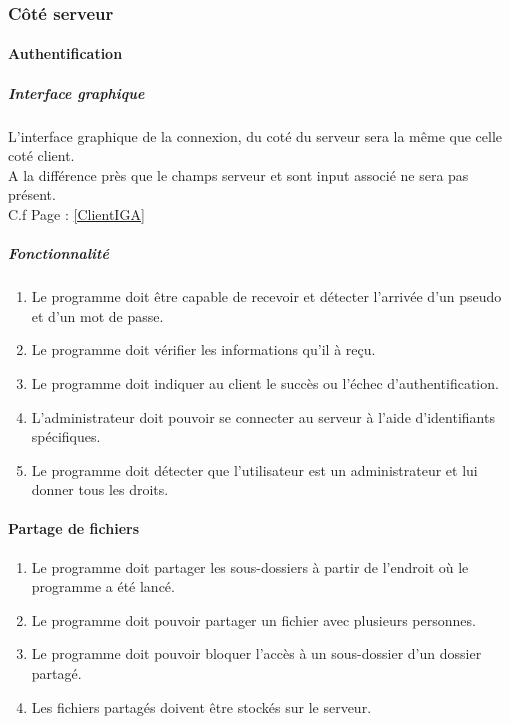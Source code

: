\documentclass[10pt,a4paper]{report}
\begin{document}
\subsubsection{Côté serveur}
\paragraph{Authentification}
	
	\subparagraph{Interface graphique}
		L'interface graphique de la connexion, du coté du serveur sera la même que celle coté client.\\
		A la différence près que le champs serveur et sont input associé ne sera pas présent.\\
		C.f Page \pageref{ClientIGA} : \ref{ClientIGA}
	\subparagraph{Fonctionnalité}
	\begin{enumerate}
		\item Le programme doit être capable de recevoir et détecter l'arrivée d'un pseudo et d'un mot de passe.
		\item Le programme doit vérifier les informations qu'il à reçu.
		\item Le programme doit indiquer au client le succès ou l'échec d'authentification.
		\item L'administrateur doit pouvoir se connecter au serveur à l'aide d'identifiants spécifiques.
		\item Le programme doit détecter que l'utilisateur est un administrateur et lui donner tous les droits.	
	\end{enumerate}
	
\paragraph{Partage de fichiers}
	\begin{enumerate}
		\item Le programme doit partager les sous-dossiers à partir de l'endroit où le programme a été lancé.
		\item Le programme doit pouvoir partager un fichier avec plusieurs personnes.
		\item Le programme doit pouvoir bloquer l'accès à un sous-dossier d'un dossier partagé.
		\item Les fichiers partagés doivent être stockés sur le serveur.
	\end{enumerate}
	
\end{document}
